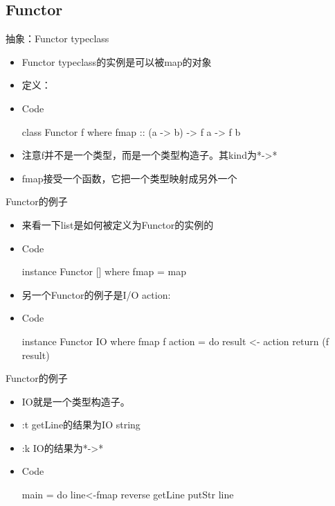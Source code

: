 \documentclass[xcolor=dvipsnames, 11pt]{beamer}
\newenvironment{code}{\begin{block}{Code}\begin{semiverbatim} \begin{footnotesize}}{\end{footnotesize}\end{semiverbatim}\end{block}}
\newenvironment{iit}{\begin{itemize}\setlength{\itemsep}{0.2cm}}{\end{itemize}}
\begin{document}
\subsection{Functor}
\begin{frame}[fragile]{抽象：Functor typeclass}
\begin{iit}
\item<2->Functor typeclass的实例是可以被map的对象
\item<3->定义：
\item<4->[]\begin{code}
class Functor f where   
    fmap :: (a -> b) -> f a -> f b
\end{code}
\item<5->注意f并不是一个类型，而是一个类型构造子。其kind为*->*
\item<6->fmap接受一个函数，它把一个类型映射成另外一个
\end{iit}
\end{frame}

\begin{frame}[fragile]{Functor的例子}
\begin{iit}
\item<2->来看一下list是如何被定义为Functor的实例的
\item<3->[]\begin{code}
instance Functor [] where
    fmap = map
\end{code}
\vspace{0.2cm}
\item<4->另一个Functor的例子是I/O action:
\item<5->[]\begin{code}
instance Functor IO where 
    fmap f action = do 
        result <- action 
        return (f result)
\end{code}
\end{iit}
\end{frame}

\begin{frame}[fragile]{Functor的例子}
\begin{iit}
\item<2->IO就是一个类型构造子。
\item<3->:t getLine的结果为IO string
\item<4->:k IO的结果为*->*
\item<5->[]\begin{code}
main = do line<-fmap reverse getLine
          putStr line
\end{code}
\end{iit}
\end{frame}
\end{document}
